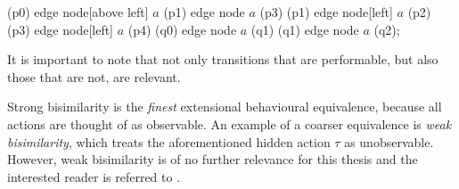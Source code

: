 \begin{isabellebody}
\begin{isamarkuptext}
{{    \path   (p0) edge node[above left]  {$a$}   (p1)
                 edge node              {$a$}   (p3)
            (p1) edge node[left]        {$a$}   (p2)
            (p3) edge node[left]        {$a$}   (p4)
            (q0) edge node              {$a$}   (q1)
            (q1) edge node              {$a$}   (q2);
}}

\pagebreak
It is important to note that not only transitions that are performable, but also those that are not, are relevant.


Strong bisimilarity is the \emph{finest} extensional behavioural equivalence, because all actions are thought of as observable. An example of a coarser equivalence is \emph{weak bisimilarity}, which treats the aforementioned hidden action $\tau$ as unobservable. However, weak bisimilarity is of no further relevance for this thesis and the interested reader is referred to \cite[Chapter 3.4]{resyst}.


\end{isamarkuptext}
\end{isabellebody}
